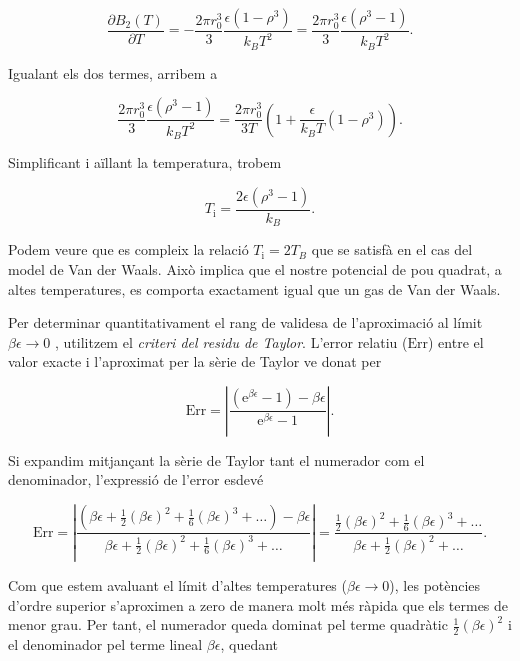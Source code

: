 \documentclass[a4paper, 10pt]{article}
\begin{document}
\begin{equation}
	\frac{\partial B_2(T)}{\partial T} = - \frac{2\pi r_0^3}{3} \frac{\epsilon (1 - \rho^3)}{k_B T^2} = \frac{2\pi r_0^3}{3} \frac{\epsilon (\rho^3 - 1)}{k_B T^2}.
\end{equation}

Igualant els dos termes, arribem a

\begin{equation}
	\frac{2\pi r_0^3}{3} \frac{\epsilon (\rho^3 - 1)}{k_B T^2} = \frac{2\pi r_0^3}{3 T}\left( 1 + \frac{\epsilon}{k_B T} (1-\rho^3)\right).
\end{equation}

Simplificant i aïllant la temperatura, trobem

\begin{equation}
	\boxed{ T_{\text{i}} = \frac{2 \epsilon (\rho^3 - 1) }{k_B} }.
	\label{eq:Tinv} 
\end{equation}

Podem veure que es compleix la relació $T_{\text{i}} = 2 T_B$ que se satisfà en el cas del model de Van der Waals. Això implica que el nostre potencial de pou quadrat, a altes temperatures, es comporta exactament igual que un gas de Van der Waals.


Per determinar quantitativament el rang de validesa de l'aproximació al límit $\beta\epsilon \to 0$ , utilitzem el \textit{criteri del residu de Taylor}. L'error relatiu ($\text{Err}$) entre el valor exacte i l'aproximat per la sèrie de Taylor ve donat per

\begin{equation}
	\text{Err} = \left\lvert \frac{(\mathrm{e}^{\beta\epsilon} - 1) - \beta\epsilon}{\mathrm{e}^{\beta\epsilon} - 1} \right\rvert.
\end{equation}

Si expandim mitjançant la sèrie de Taylor tant el numerador com el denominador, l'expressió de l'error esdevé

\begin{equation}
	\text{Err} = \left\lvert \frac{\left(\beta\epsilon + \frac{1}{2}(\beta\epsilon)^2 + \frac{1}{6}(\beta\epsilon)^3 + \dots\right) - \beta\epsilon}{\beta\epsilon + \frac{1}{2}(\beta\epsilon)^2 + \frac{1}{6}(\beta\epsilon)^3 + \dots} \right\rvert = \frac{\frac{1}{2}(\beta\epsilon)^2 + \frac{1}{6}(\beta\epsilon)^3 + \dots}{\beta\epsilon + \frac{1}{2}(\beta\epsilon)^2 + \dots}.
\end{equation}

Com que estem avaluant el límit d'altes temperatures ($\beta\epsilon \to 0$), les potències d'ordre superior s'aproximen a zero de manera molt més ràpida que els termes de menor grau. Per tant, el numerador queda dominat pel terme quadràtic $\frac{1}{2}(\beta\epsilon)^2$ i el denominador pel terme lineal $\beta\epsilon$, quedant
\end{document}
